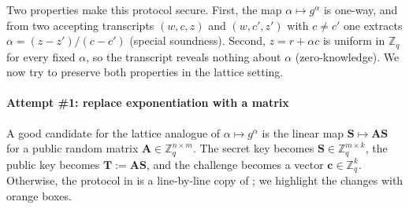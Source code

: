 \documentclass[../../book.tex]{subfiles}
\begin{document}
Two properties make this protocol secure.
First, the map $\alpha \mapsto g^{\alpha}$ is one-way, and from two accepting transcripts $(w,c,z)$ and $(w,c',z')$ with $c \neq c'$ one extracts $\alpha = (z-z')/(c-c')$ (special soundness).
Second, $z = r + \alpha c$ is uniform in $\mathbb{Z}_q$ for every fixed $\alpha$, so the transcript reveals nothing about $\alpha$ (zero-knowledge).
We now try to preserve both properties in the lattice setting.

\paragraph{Attempt \#1: replace exponentiation with a matrix}
A good candidate for the lattice analogue of $\alpha \mapsto g^{\alpha}$ is the linear map $\mathbf{S} \mapsto \mathbf{A}\mathbf{S}$ for a public random matrix $\mathbf{A} \in \mathbb{Z}_q^{n \times m}$.
The secret key becomes $\mathbf{S} \in \mathbb{Z}_q^{m \times k}$, the public key becomes $\mathbf{T} := \mathbf{A}\mathbf{S}$, and the challenge becomes a vector $\mathbf{c} \in \mathbb{Z}_q^k$.
Otherwise, the protocol in  is a line-by-line copy of ; we highlight the changes with \colorbox{oc-orange-1}{orange boxes}.
\end{document}
